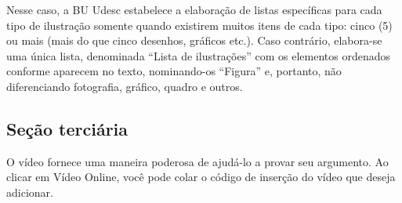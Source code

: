 	\begin{table}
		\caption{Tabela 4 do Artigo Original.}
		\label{tab:tabela4}
		\end{table}
Nesse caso, a BU Udesc estabelece a elaboração de listas específicas para cada tipo de ilustração somente quando existirem muitos itens de cada tipo: cinco (5) ou mais (mais do que cinco desenhos, gráficos etc.). Caso contrário, elabora-se uma única lista, denominada “Lista de ilustrações” com os elementos ordenados conforme aparecem no texto, nominando-os “Figura” e, portanto, não diferenciando fotografia, gráfico, quadro e outros.


\subsection{Seção terciária}

O vídeo fornece uma maneira poderosa de ajudá-lo a provar seu argumento. Ao clicar em Vídeo Online, você pode colar o código de inserção do vídeo que deseja adicionar.

